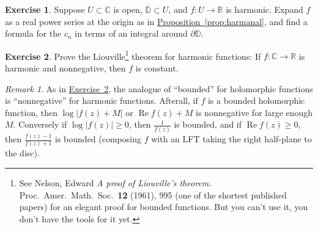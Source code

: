 \documentclass[12pt,openany]{book}
\renewcommand{\Re}{\operatorname{Re}}
\newcommand{\sabs}[1]{\lvert {#1} \rvert}
\newcommand{\C}{{\mathbb{C}}}
\newcommand{\R}{{\mathbb{R}}}
\newcommand{\D}{{\mathbb{D}}}
\newcommand{\myquote}[1]{``#1''}
\theoremstyle{plain}
\theoremstyle{remark}
\newtheorem{remark}[thm]{Remark}
\theoremstyle{definition}
\newenvironment{exbox}{%
    \def\FrameCommand{\vrule width 1pt \relax\hspace{10pt}}%
    \MakeFramed{\advance\hsize-\width\FrameRestore}%
}{%
    \endMakeFramed
}
\theoremstyle{exercise}
\newtheorem{exercise}{Exercise}[section]
\theoremstyle{example}
\newcommand{\exerciseref}[1]{\hyperref[#1]{Exercise~\ref*{#1}}}
\newcommand{\propref}[1]{\hyperref[#1]{Proposition~\ref*{#1}}}
\begin{document}
\begin{savenotes}
\begin{exbox}
\begin{exercise}
Suppose $U \subset \C$ is open, $\overline{\D} \subset U$,
and $f \colon U \to \R$ is harmonic.  Expand
$f$ as a real power series at the origin as in \propref{prop:harmanal}, and find a formula
for the $c_n$ in terms
of an integral around $\partial \D$.
\end{exercise}

\begin{exercise}\label{exercise:Liouvilleharmonic}
\pagebreak[2]
Prove the Liouville\footnote{%
See
Nelson, Edward
\emph{A proof of Liouville's theorem.}
Proc.\ Amer.\ Math.\ Soc.\ {\textbf{12}} (1961), 995
(one of the shortest published papers) for
an elegant proof for bounded functions.
But you can't use it, you don't have the
tools for it yet.} theorem for
harmonic functions:  If $f \colon \C \to \R$ is harmonic
and nonnegative, then $f$ is constant.
\end{exercise}
\end{exbox}
\end{savenotes}

\begin{remark}
As in \exerciseref{exercise:Liouvilleharmonic},
the analogue of \myquote{bounded} for holomorphic functions is
\myquote{nonnegative}
for harmonic functions.  Afterall, if $f$ is
a bounded holomorphic function, then $\log \sabs{f(z)+M}$ or $\Re f(z) + M$
is nonnegative for large enough $M$.  Conversely if $\log \sabs{f(z)} \geq
0$, then $\frac{1}{f(z)}$ is bounded, and if $\Re f(z) \geq 0$, then
$\frac{f(z)-1}{f(z)+1}$ is bounded (composing $f$ with an LFT taking the
right half-plane to the disc).
\end{remark}
\end{document}
